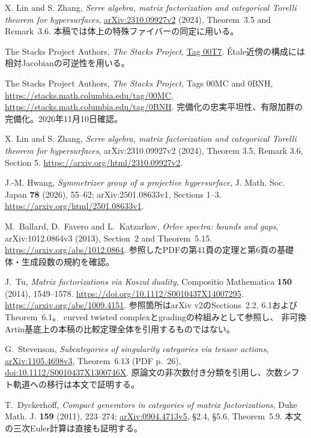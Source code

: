 X. Lin and S. Zhang, \emph{Serre algebra, matrix factorization and categorical Torelli theorem for hypersurfaces},
\href{https://arxiv.org/abs/2310.09927v2}{arXiv:2310.09927v2} (2024),
Theorem~3.5 and Remark~3.6. 本稿では体上の特殊ファイバーの同定に用いる。

The Stacks Project Authors, \emph{The Stacks Project},
\href{https://stacks.math.columbia.edu/tag/00T7}{Tag 00T7}.
\'Etale近傍の構成には相対Jacobianの可逆性を用いる。

The Stacks Project Authors,
\emph{The Stacks Project}, Tags 00MC and 0BNH,
\url{https://stacks.math.columbia.edu/tag/00MC},
\url{https://stacks.math.columbia.edu/tag/0BNH}.
完備化の忠実平坦性、有限加群の完備化。2026年11月10日確認。

X. Lin and S. Zhang,
\emph{Serre algebra, matrix factorization and categorical Torelli theorem for hypersurfaces},
arXiv:2310.09927v2 (2024), Theorem 3.5, Remark 3.6, Section 5.
\url{https://arxiv.org/html/2310.09927v2}.

J.-M. Hwang,
\emph{Symmetrizer group of a projective hypersurface},
J. Math. Soc. Japan \textbf{78} (2026), 55--62;
arXiv:2501.08633v1, Sections 1--3.
\url{https://arxiv.org/html/2501.08633v1}.

M.~Ballard, D.~Favero and L.~Katzarkov,
\emph{Orlov spectra: bounds and gaps},
arXiv:1012.0864v3 (2013), Section~2 and Theorem~5.15.
\url{https://arxiv.org/abs/1012.0864}.
参照したPDFの第41頁の定理と第6頁の基礎体・生成段数の規約を確認。

J.~Tu,
\emph{Matrix factorizations via Koszul duality},
Compositio Mathematica \textbf{150} (2014), 1549--1578.
\url{https://doi.org/10.1112/S0010437X14007295}.
\url{https://arxiv.org/abs/1009.4151}.
参照箇所はarXiv v2のSections~2.2, 6.1およびTheorem~6.1。
curved twisted complexとgradingの枠組みとして参照し、
非可換Artin基底上の本稿の比較定理全体を引用するものではない。

G.~Stevenson, \emph{Subcategories of singularity categories via tensor actions},
\href{https://arxiv.org/abs/1105.4698v3}{arXiv:1105.4698v3},
Theorem~6.13 (PDF p.~26),
\href{https://doi.org/10.1112/S0010437X1300746X}{doi:10.1112/S0010437X1300746X}.
原論文の非次数付き分類を引用し、次数シフト軌道への移行は本文で証明する。

T.~Dyckerhoff, \emph{Compact generators in categories of matrix factorizations},
Duke Math. J. \textbf{159} (2011), 223--274;
\href{https://arxiv.org/abs/0904.4713v5}{arXiv:0904.4713v5},
\S2.4, \S5.6, Theorem~5.9. 本文の三次Euler計算は直接も証明する。

